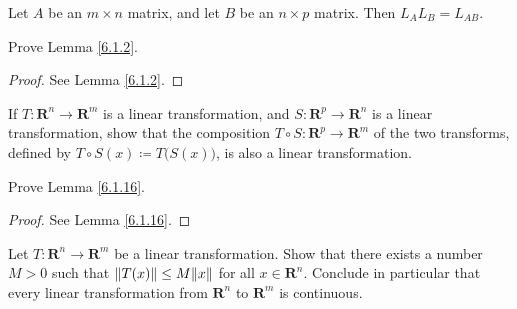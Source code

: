 \begin{lemma}\label{6.1.16}
    Let \(A\) be an \(m \times n\) matrix, and let \(B\) be an \(n \times p\) matrix.
    Then \(L_A L_B = L_{AB}\).
\end{lemma}

\exercisesection

\begin{exercise}\label{ex 6.1.1}
    Prove Lemma \ref{6.1.2}.
\end{exercise}

\begin{proof}
    See Lemma \ref{6.1.2}.
\end{proof}

\begin{exercise}\label{ex 6.1.2}
    If \(T : \mathbf{R}^n \to \mathbf{R}^m\) is a linear transformation, and \(S : \mathbf{R}^p \to \mathbf{R}^n\) is a linear transformation, show that the composition \(T \circ S : \mathbf{R}^p \to \mathbf{R}^m\) of the two transforms, defined by \(T \circ S(x) \coloneqq T\big(S(x)\big)\), is also a linear transformation.
\end{exercise}

\begin{exercise}\label{ex 6.1.3}
    Prove Lemma \ref{6.1.16}.
\end{exercise}

\begin{proof}
    See Lemma \ref{6.1.16}.
\end{proof}

\begin{exercise}\label{ex 6.1.4}
    Let \(T : \mathbf{R}^n \to \mathbf{R}^m\) be a linear transformation.
    Show that there exists a number \(M > 0\) such that \(\norm*{T(x)} \leq M \norm*{x}\) for all \(x \in \mathbf{R}^n\).
    Conclude in particular that every linear transformation from \(\mathbf{R}^n\) to \(\mathbf{R}^m\) is continuous.
\end{exercise}
